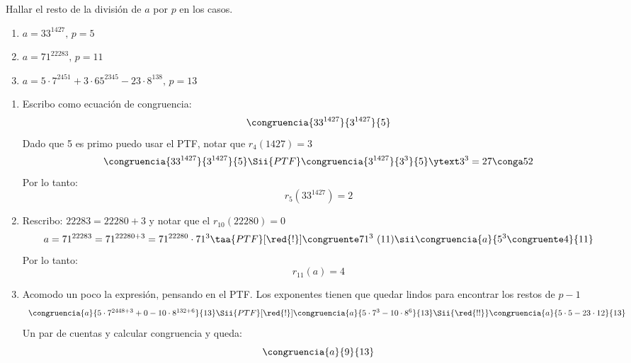 \begin{enunciado}{\ejercicio}
  Hallar el resto de la división de $a$ por $p$ en los casos.
  \begin{enumerate}[label=\alph*)]
    \item $a = 33^{1427}, \, p =5$
    \item $a = 71^{22283},\, p=11$
    \item $a = 5 \cdot 7^{2451} + 3 \cdot 65^{2345} - 23 \cdot 8^{138}, \, p = 13$
  \end{enumerate}
\end{enunciado}

\begin{enumerate}[label=\alph*)]
  \item Escribo como ecuación de congruencia:
        $$
          \congruencia{33^{1427}}{3^{1427}}{5}
        $$
        Dado que 5 es primo puedo usar el PTF, notar que $r_4(1427) = 3 $
        $$
          \congruencia{33^{1427}}{3^{1427}}{5}
          \Sii{PTF}
          \congruencia{3^{1427}}{3^3}{5} \ytext 3^3 = 27 \conga5 2
        $$
        Por lo tanto:
        $$
          r_5(33^{1427}) = 2
        $$
  \item
        Rescribo: $22283 = 22280 + 3$ y notar que el $r_{10}(22280) = 0$
        $$
          a = 71^{22283} =
          71^{22280 + 3} =
          71^{22280} \cdot 71^3
          \taa{PTF}[\red{!}]{\congruente} 71^3 \ (11)
          \sii
          \congruencia{a}{5^3 \congruente 4}{11}
        $$
        Por lo tanto:
        $$
          r_{11}(a) = 4
        $$

  \item
        Acomodo un poco la expresión, pensando en el PTF. Los exponentes tienen que quedar lindos para encontrar los restos de $p-1$
        $$
          \begin{array}{l}
            \congruencia{a}{5 \cdot 7^{2448 + 3} + 0 - 10 \cdot 8^{132 + 6}}{13}
            \Sii{PTF}[\red{!}]
            \congruencia{a}{5 \cdot 7^3 - 10 \cdot 8^6}{13}
            \Sii{\red{!!}}
            \congruencia{a}{5 \cdot 5 - 23 \cdot 12}{13}
          \end{array}
        $$
        Un par de cuentas y calcular congruencia y queda:
        $$
          \congruencia{a}{9}{13}
        $$
\end{enumerate}

\begin{aportes}
  \item {}
\end{aportes}
